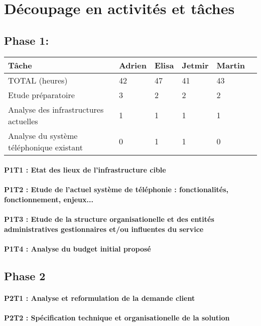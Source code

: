 \section{Découpage en activités et tâches}

\subsection{Phase 1: }
\begin{tabular}{|l|l|l|l|l|l}
\hline	
Tâche & Adrien & Elisa & Jetmir & Martin \\ \hline
TOTAL (heures) & 42 & 47 & 41 & 43 \\ \hline
Etude préparatoire & 3 & 2 & 2 & 2 \\ \hline
Analyse des infrastructures actuelles & 1 & 1 & 1 & 1 \\ \hline
Analyse du système téléphonique existant & 0 & 1 & 1 & 0 \\ \hline
\end{tabular}



\paragraph{P1T1 : Etat des lieux de l'infrastructure cible}
\paragraph{P1T2 : Etude de l'actuel système de téléphonie : fonctionalités, fonctionnement, enjeux... }
\paragraph{P1T3 : Etude de la structure organisationelle et des entités administratives gestionnaires et/ou influentes du service}
\paragraph{P1T4 : Analyse du budget initial proposé}

\subsection{Phase 2}
\paragraph{P2T1 : Analyse et reformulation de la demande client}
\paragraph{P2T2 : Spécification technique et organisationelle de la solution}
